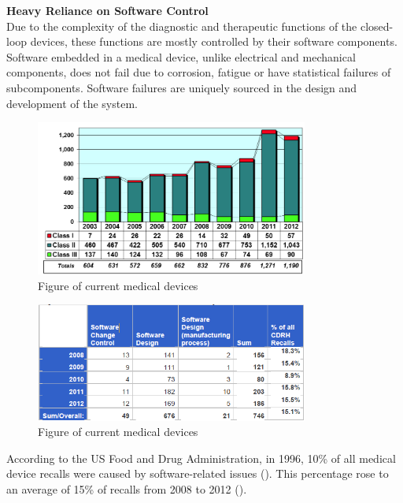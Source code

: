 \textbf{Heavy Reliance on Software Control}\\
Due to the complexity of the diagnostic and therapeutic functions of the closed-loop devices, these functions are mostly controlled by their software components. 
Software embedded in a medical device, unlike electrical and mechanical components, does not fail due to corrosion, fatigue or have statistical failures of subcomponents. Software failures are uniquely sourced in the design and development of the system. %
\begin{figure}[t]
		\centering
		\includegraphics[width=0.8\textwidth]{figs/recalls.jpg}
		\caption{\small Figure of current medical devices}
		\label{fig:recalls}
\end{figure}
\begin{figure}[t]
		\centering
		\includegraphics[width=0.8\textwidth]{figs/soft_recalls.jpg}
		\caption{\small Figure of current medical devices}
		\label{fig:soft_recalls}
\end{figure}
According to the US Food and Drug Administration, in 1996, 10\% of all medical device recalls were caused by software-related issues (\cite{medstats}). This percentage rose to an average of 15\% of recalls from 2008 to 2012 (). %
	
